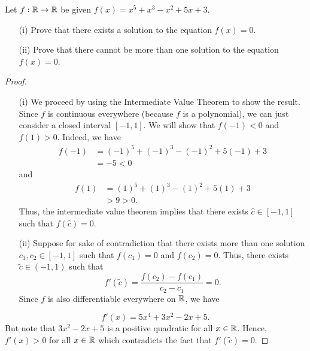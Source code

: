 \documentclass[a4paper]{article}
\begin{document}
\begin{problem}
    Let \( f: \mathbb{R} \to \mathbb{R}  \) be given \( f(x) = x^{5} + x^{3} - x^{2} + 5x + 3  \).
    \begin{enumerate}
        \item[(i)] Prove that there exists a solution to the equation \( f(x) = 0  \).
        \item[(ii)] Prove that there cannot be more than one solution to the equation \( f(x) = 0  \).
    \end{enumerate}
\end{problem}
\begin{proof}
\begin{enumerate}
    \item[(i)] We proceed by using the Intermediate Value Theorem to show the result. Since \( f  \) is continuous everywhere (because \( f  \) is a polynomial), we can just consider a closed interval \( [-1,1] \). We will show that \( f(-1) < 0  \) and \( f(1) > 0  \). Indeed, we have 
        \begin{align*}
            f(-1) &= (-1)^{5} + (-1)^{3} - (-1)^{2} + 5(-1) + 3 \\
                  &= -5 < 0 
        \end{align*}
        and
        \begin{align*}
            f(1) &= (1)^{5} + (1)^{3} - (1)^{2} + 5(1) + 3  \\
                 &> 9 > 0. 
        \end{align*}
        Thus, the intermediate value theorem implies that there exists \( \hat{c} \in [-1,1] \) such that \( f(\hat{c}) = 0  \).
    \item[(ii)] Suppose for sake of contradiction that there exists more than one solution \( {c}_{1}, {c}_{2} \in [-1,1] \) such that \( f({c}_{1}) = 0  \) and \( f({c}_{2}) = 0  \). Thus, there exists \( \tilde{c} \in (-1,1) \) such that  
        \[  f'(\tilde{c}) = \frac{ f({c}_{2}) - f({c}_{1}) }{  {c}_{2} - {c}_{1} }  = 0.  \]
        Since \( f  \) is also differentiable everywhere on \( \mathbb{R}  \), we have 
\end{enumerate}
\[  f'(x) = 5 x^{4} + 3 x^{2} - 2x  + 5. \]
But note that \( 3x^{2} -2x + 5  \) is a positive quadratic for all \( x \in \mathbb{R}  \). Hence, \( f'(x) > 0  \) for all \( x \in \mathbb{R}  \) which contradicts the fact that \( f'(\tilde{c}) = 0   \).
\end{proof}
\end{document}
